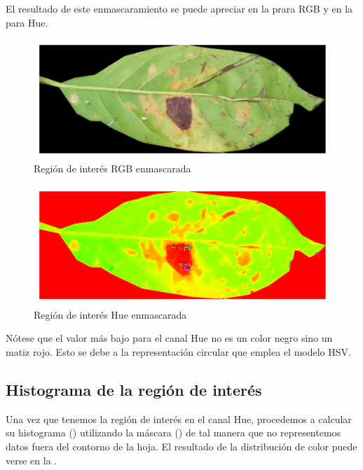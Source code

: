 El resultado de este enmascaramiento se puede apreciar en la  prara \textsf{RGB} y en la  para \textsf{Hue}.

\begin{figure}[H]
\centering
\includegraphics[scale=1]{images/masked_roi_rgb.png}
\caption{Región de interés RGB enmascarada}
\label{img:masked_roi_rgb}
\end{figure}

\begin{figure}[H]
\centering
\includegraphics[scale=1]{images/masked_roi_hue.png}
\caption{Región de interés Hue enmascarada}
\label{img:masked_roi_hue}
\end{figure}

Nótese que el valor más bajo para el canal Hue no es un color negro sino un matiz rojo. Esto se debe a la representación circular que emplea el modelo \textsf{HSV}.

\subsection{Histograma de la región de interés}
Una vez que tenemos la región de interés en el canal Hue, procedemos a calcular su histograma () utilizando la máscara () de tal manera que no representemos datos fuera del contorno de la hoja. El resultado de la distribución de color puede verse en la .

